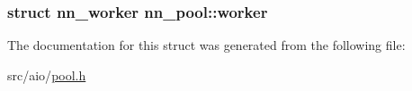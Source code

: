 \subsubsection[{worker}]{\setlength{\rightskip}{0pt plus 5cm}struct {\bf nn\+\_\+worker} nn\+\_\+pool\+::worker}\hypertarget{structnn__pool_a5e271d82592f7d332ae2de798bc1906b}{}\label{structnn__pool_a5e271d82592f7d332ae2de798bc1906b}


The documentation for this struct was generated from the following file\+:\begin{DoxyCompactItemize}
\item 
src/aio/\hyperlink{pool_8h}{pool.\+h}\end{DoxyCompactItemize}
